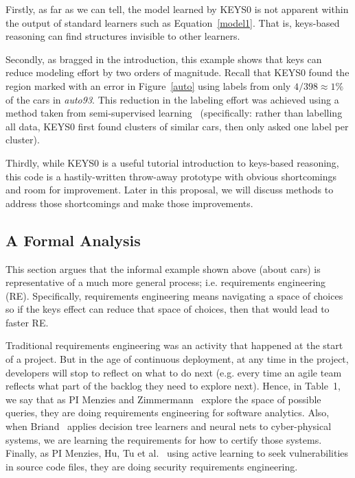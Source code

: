 Firstly, as far as we can tell, the model learned by KEYS0 is not apparent
within the output of standard learners
such as Equation~\ref{model1}. That is, keys-based reasoning can find
structures invisible to other learners.

Secondly,  as  bragged in the introduction,
this example shows that keys can reduce   modeling effort
by two orders of magnitude. Recall  that KEYS0
found the region marked with an error in 
Figure~\ref{auto} using labels from
only $4/398\approx 1\%$ of the cars
in {\em auto93}. This reduction in the labeling effort was achieved
using a method taken from  semi-supervised learning~\cite{van2020survey}
(specifically: rather than labelling all  data,
KEYS0 first found clusters of similar  cars, then  only asked   one label per cluster).



Thirdly,  while KEYS0 is a useful tutorial
 introduction to keys-based reasoning,
  this code
 is a hastily-written throw-away prototype with obvious shortcomings
 and room for improvement.  Later in this proposal, we will discuss methods to
 address those shortcomings and make those improvements. 


\subsection{A Formal Analysis}
This section argues that the informal
example shown above (about cars)
is representative of a much more
general process; i.e. requirements engineering (RE). 
Specifically, requirements engineering  means navigating a space of choices
so if the keys effect can reduce that space of choices, then that
would lead to faster RE.

 Traditional  requirements
engineering was an activity
that happened at the start of a project. But in the age of
continuous deployment,  at any time in the project, developers will stop to reflect on what to do next 
(e.g. every time an agile team reflects what part of the backlog they need
to explore next).  Hence, in Table~1, we say that as  PI Menzies and Zimmermann~\cite{timzim13}
explore the space of possible queries,
  they are doing requirements engineering for software analytics. Also,
  when Briand~\cite{Abdessalem18} applies decision tree learners and neural nets to cyber-physical systems,
  we are learning the requirements for how to certify those systems. Finally,
  as PI Menzies, Hu, Tu et al.~\cite{zhe19,tu20} using active learning to seek vulnerabilities
  in source code files, they
  are doing security requirements engineering. 

